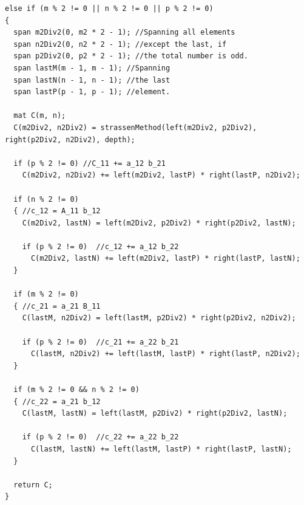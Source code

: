 \begin{lstlisting}[float,label={lst:OpenCL:Strassen_p2},caption={Strassen p2. Continuation of listing~\ref{lst:OpenCL:Strassen_p1}.},name={strassen_complete}]
else if (m % 2 != 0 || n % 2 != 0 || p % 2 != 0) 
{
  span m2Div2(0, m2 * 2 - 1); //Spanning all elements
  span n2Div2(0, n2 * 2 - 1); //except the last, if
  span p2Div2(0, p2 * 2 - 1); //the total number is odd.
  span lastM(m - 1, m - 1); //Spanning 
  span lastN(n - 1, n - 1); //the last
  span lastP(p - 1, p - 1); //element.

  mat C(m, n);
  C(m2Div2, n2Div2) = strassenMethod(left(m2Div2, p2Div2), right(p2Div2, n2Div2), depth);

  if (p % 2 != 0) //C_11 += a_12 b_21
    C(m2Div2, n2Div2) += left(m2Div2, lastP) * right(lastP, n2Div2);

  if (n % 2 != 0)
  {	//c_12 = A_11 b_12
    C(m2Div2, lastN) = left(m2Div2, p2Div2) * right(p2Div2, lastN);

    if (p % 2 != 0)  //c_12 += a_12 b_22
      C(m2Div2, lastN) += left(m2Div2, lastP) * right(lastP, lastN);        
  }

  if (m % 2 != 0)
  {	//c_21 = a_21 B_11
    C(lastM, n2Div2) = left(lastM, p2Div2) * right(p2Div2, n2Div2);

    if (p % 2 != 0)  //c_21 += a_22 b_21
      C(lastM, n2Div2) += left(lastM, lastP) * right(lastP, n2Div2);
  }

  if (m % 2 != 0 && n % 2 != 0)
  {	//c_22 = a_21 b_12
    C(lastM, lastN) = left(lastM, p2Div2) * right(p2Div2, lastN);

    if (p % 2 != 0)  //c_22 += a_22 b_22
      C(lastM, lastN) += left(lastM, lastP) * right(lastP, lastN);
  }

  return C;
}
\end{lstlisting}






